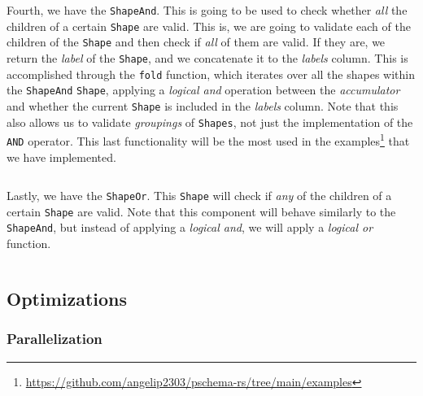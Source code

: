 \begin{code}
    \inputminted{rust}{code/listings/11-14_cardinality.rs}
\end{code}

Fourth, we have the \texttt{ShapeAnd}. This is going to be used to check whether \textit{all} the children of a certain \texttt{Shape} are valid. This is, we are going to validate each of the children of the \texttt{Shape} and then check if \textit{all} of them are valid. If they are, we return the \textit{label} of the \texttt{Shape}, and we concatenate it to the \textit{labels} column. This is accomplished through the \texttt{fold} function, which iterates over all the shapes within the \texttt{ShapeAnd} \texttt{Shape}, applying a \textit{logical and} operation between the \textit{accumulator} and whether the current \texttt{Shape} is included in the \textit{labels} column. Note that this also allows us to validate \textit{groupings} of \texttt{Shapes}, not just the implementation of the \texttt{AND} operator. This last functionality will be the most used in the examples\footnote{\url{https://github.com/angelip2303/pschema-rs/tree/main/examples}} that we have implemented.

\begin{code}
    \inputminted{rust}{code/listings/11-12_and.rs}
\end{code}

Lastly, we have the \texttt{ShapeOr}. This \texttt{Shape} will check if \textit{any} of the children of a certain \texttt{Shape} are valid. Note that this component will behave similarly to the \texttt{ShapeAnd}, but instead of applying a \textit{logical and}, we will apply a \textit{logical or} function.

\begin{code}
    \inputminted{rust}{code/listings/11-13_or.rs}
\end{code}

\subsection{Optimizations}

\subsubsection{Parallelization}

